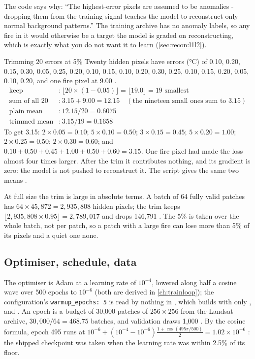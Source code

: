 The code says why: ``The highest-error pixels are assumed to be anomalies - dropping them from the training signal
teaches the model to reconstruct only normal background patterns.'' The training archive has no anomaly labels, so
any fire in it would otherwise be a target the model is graded on reconstructing, which is exactly what you do not
want it to learn (\cref{sec:recon:l1l2}).

\begin{worked}[label={we:chakshu:trim}]{Trimming 20 errors at 5\%}
Twenty hidden pixels have errors (°C) of 0.10, 0.20, 0.15, 0.30, 0.05, 0.25, 0.20, 0.10, 0.15, 0.10, 0.20, 0.30,
0.25, 0.10, 0.15, 0.20, 0.05, 0.10, 0.20, and one fire pixel at 9.00 \tagA.
\begin{align*}
\text{keep} &: \lfloor20\times(1-0.05)\rfloor = \lfloor19.0\rfloor = 19 \text{ smallest}\\
\text{sum of all 20} &: 3.15+9.00 = 12.15 \quad(\text{the nineteen small ones sum to }3.15)\\
\text{plain mean} &: 12.15/20 = 0.6075\\
\text{trimmed mean} &: 3.15/19 = 0.1658
\end{align*}
To get 3.15: $2\times0.05=0.10$; $5\times0.10=0.50$; $3\times0.15=0.45$; $5\times0.20=1.00$; $2\times0.25=0.50$;
$2\times0.30=0.60$; and $0.10+0.50+0.45+1.00+0.50+0.60=3.15$. One fire pixel had made the loss almost four times
larger. After the trim it contributes nothing, and its gradient is zero: the model is not pushed to reconstruct it.
The script gives the same two means \tagC.
\end{worked}

At full size the trim is large in absolute terms. A batch of 64 fully valid patches has $64\times45{,}872=2{,}935{,}808$
hidden pixels; the trim keeps $\lfloor2{,}935{,}808\times0.95\rfloor=2{,}789{,}017$ and drops 146,791 \tagC. The 5\% is
taken over the whole batch, not per patch, so a patch with a large fire can lose more than 5\% of its pixels and a
quiet one none.

\subsection{Optimiser, schedule, data}

The optimiser is Adam at a learning rate of $10^{-4}$, lowered along half a cosine wave over 500 epochs to $10^{-6}$
(both are derived in \cref{ch:trainloop}); the configuration's
\lstinline!warmup_epochs: 5! is read by nothing in , which builds
 with only ,  and . An epoch is a budget of 30,000
patches of $256\times256$ from the Landsat archive, $30{,}000/64=468.75$ batches, and validation draws 1,000
. By the cosine formula, epoch 495 runs at
$10^{-6}+(10^{-4}-10^{-6})\tfrac{1+\cos(495\pi/500)}{2}=1.02\times10^{-6}$ \tagC: the shipped checkpoint was taken
when the learning rate was within 2.5\% of its floor.

